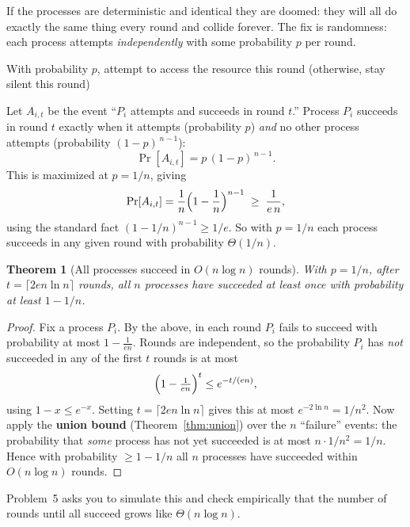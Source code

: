 \documentclass[11pt]{article}
\newtheorem{theorem}{Theorem}[section]
\begin{document}
If the processes are deterministic and identical they are doomed: they will all do
exactly the same thing every round and collide forever. The fix is randomness:
each process attempts \emph{independently} with some probability $p$ per round.

\begin{algorithm}[h]
\caption{Randomized Contention Resolution (one process $P_i$)}
\begin{algorithmic}[1]
    \State With probability $p$, attempt to access the resource this round
    \State (otherwise, stay silent this round)
\EndWhile
\end{algorithmic}
\end{algorithm}

Let $A_{i,t}$ be the event ``$P_i$ attempts and succeeds in round $t$.'' Process
$P_i$ succeeds in round $t$ exactly when it attempts (probability $p$) \emph{and}
no other process attempts (probability $(1-p)^{\,n-1}$):
\[
    \Pr[A_{i,t}] = p\,(1-p)^{\,n-1}.
\]
This is maximized at $p = 1/n$, giving
\[
    \Pr[A_{i,t}] = \frac1n\Bigl(1 - \frac1n\Bigr)^{n-1} \;\ge\; \frac{1}{e\,n},
\]
using the standard fact $(1 - 1/n)^{n-1} \ge 1/e$. So with $p = 1/n$ each process
succeeds in any given round with probability $\Theta(1/n)$.

\begin{theorem}[All processes succeed in $O(n \log n)$ rounds]
\label{thm:contention}
With $p = 1/n$, after $t = \lceil 2 e n \ln n\rceil$ rounds, all $n$ processes have
succeeded at least once with probability at least $1 - 1/n$.
\end{theorem}

\begin{proof}
Fix a process $P_i$. By the above, in each round $P_i$ fails to succeed with
probability at most $1 - \frac{1}{en}$. Rounds are independent, so the probability
$P_i$ has \emph{not} succeeded in any of the first $t$ rounds is at most
\[
    \Bigl(1 - \tfrac{1}{en}\Bigr)^{t} \le e^{-t/(en)},
\]
using $1 - x \le e^{-x}$. Setting $t = \lceil 2en\ln n\rceil$ gives this at most
$e^{-2\ln n} = 1/n^2$. Now apply the \textbf{union bound} (Theorem~\ref{thm:union})
over the $n$ ``failure'' events: the probability that \emph{some} process has not
yet succeeded is at most $n \cdot 1/n^2 = 1/n$. Hence with probability $\ge 1 -
1/n$ all $n$ processes have succeeded within $O(n \log n)$ rounds.
\end{proof}

Problem~5 asks you to simulate this and check empirically that the number of rounds
until all succeed grows like $\Theta(n \log n)$.
\end{document}
